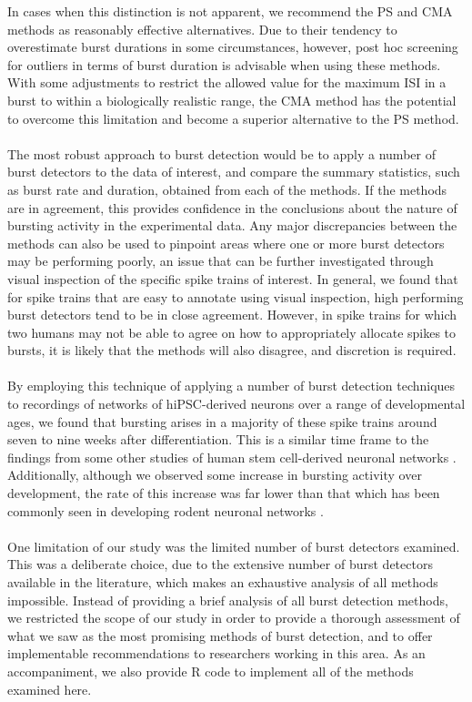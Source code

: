 \documentclass[12pt, titlepage]{article}
\begin{document}
	In cases when this distinction is not apparent, we recommend the PS and CMA methods as reasonably effective alternatives. Due to their tendency to overestimate burst durations in some circumstances, however, post hoc screening for outliers in terms of burst duration is advisable when using these methods. With some adjustments to restrict the allowed value for the maximum ISI in a burst to within a biologically realistic range, the CMA method has the potential to overcome this limitation and become a superior alternative to the PS method.
	\\ \\The most robust approach to burst detection would be to apply a number of burst detectors to the data of interest, and compare the summary statistics, such as burst rate and duration, obtained from each of the methods. %
	If the methods are in agreement, this provides confidence in the conclusions about the nature of bursting activity in the experimental data. Any major discrepancies between the methods can also be used to pinpoint areas where one or more burst detectors may be performing poorly, an issue that can be further investigated through visual inspection of the specific spike trains of interest. In general, we found that for spike trains that are easy to annotate using visual inspection, high performing burst detectors tend to be in close agreement. However, in spike trains for which two humans may not be able to agree on how to appropriately allocate spikes to bursts, it is likely that the methods will also disagree, and discretion is required.
	\\ \\By employing this technique of applying a number of burst detection techniques to recordings of networks of hiPSC-derived neurons over a range of developmental ages, we found that bursting arises in a majority of these spike trains around seven to nine weeks after differentiation.  This is a similar time frame to the findings from some other studies of human stem cell-derived neuronal networks \cite{Heikkila2009,Kirwan2015}. Additionally, although we observed some increase in bursting activity over development, the rate of this increase was far lower than that which has been commonly seen in developing rodent neuronal networks \cite{Chiappalone2005,Charlesworth2015,Demas2003}.
	\\ \\One limitation of our study was the limited number of burst detectors examined. This was a deliberate choice, due to the extensive number of burst detectors available in the literature, which makes an exhaustive analysis of all methods impossible. Instead of providing a brief analysis of all burst detection methods, we restricted the scope of our study in order to provide a thorough assessment of what we saw as the most promising methods of burst detection, and to offer implementable recommendations to researchers working in this area. As an accompaniment, we also provide R code to implement all of the methods examined here.
\end{document}
